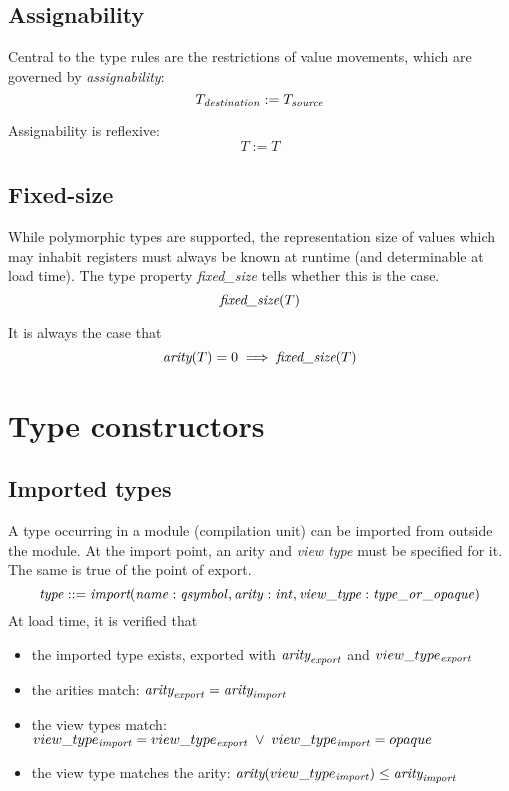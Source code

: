 \documentclass[a4paper]{report}
\newcommand\arity{{\ensuremath\textit{arity}}}
\newcommand\fixedsize{{\ensuremath\textit{fixed\_size}}}
\newcommand\implies{\;\Longrightarrow\;}
\newcommand\tyImport{{\ensuremath\textit{import}}}
\begin{document}
\subsection{Assignability}
Central to the type rules are the restrictions of value movements,
which are governed by \emph{assignability}:
$$
T_{\it destination} := T_{\it source}
$$

Assignability is reflexive:
$$T := T$$

\subsection{Fixed-size}
While polymorphic types are supported, the representation size of values
which may inhabit registers must always be known at runtime (and
determinable at load time).
The type property \emph{fixed\_size} tells whether this is the case.
$$
\fixedsize(T)
$$

It is always the case that
$$
\arity(T) = 0 \implies \fixedsize(T)
$$

\section{Type constructors}

\subsection{Imported types}
A type occurring in a module (compilation unit) can be imported from
outside the module.
At the import point, an arity and \emph{view type} must be specified for it.
The same is true of the point of export.
$$
\it type ::= \tyImport(name : qsymbol, arity : int, view\_type : type\_or\_opaque)
$$
At load time, it is verified that
\begin{itemize}
\item the imported type exists, exported with $\arity_{\it export}$
  and $view\_type_{\it export}$
\item the arities match: $\arity_{\it export} = \arity_{\it import}$
\item the view types match:\\
$view\_type_{\it import} = view\_type_{\it export} \;\lor\; view\_type_{\it import} = opaque$
\item the view type matches the arity: $\arity(view\_type_{\it import}) \le \arity_{\it import}$
\end{itemize}
\end{document}
